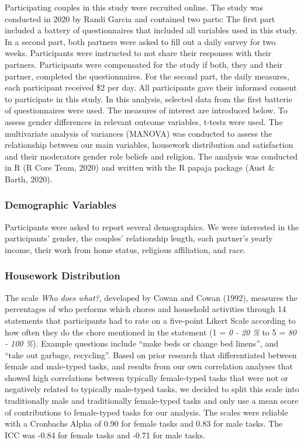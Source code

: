 \documentclass[
  man,floatsintext]{apa6}
\begin{document}
Participating couples in this study were recruited online. The study was conducted in 2020 by Randi Garcia and contained two parts: The first part included a battery of questionnaires that included all variables used in this study. In a second part, both partners were asked to fill out a daily survey for two weeks. Participants were instructed to not share their responses with their partners. Participants were compensated for the study if both, they and their partner, completed the questionnaires. For the second part, the daily measures, each participant received \$2 per day. All participants gave their informed consent to participate in this study.
In this analysis, selected data from the first batterie of questionnaires were used. The measures of interest are introduced below.
To assess gender differences in relevant outcome variables, t-tests were used. The multivariate analysis of variances (MANOVA) was conducted to assess the relationship between our main variables, housework distribution and satisfaction and their moderators gender role beliefs and religion.
The analysis was conducted in R (R Core Team, 2020) and written with the R papaja package (Aust \& Barth, 2020).

\hypertarget{demographic-variables}{%
\subsubsection{Demographic Variables}\label{demographic-variables}}

Participants were asked to report several demographics. We were interested in the participants' gender, the couples' relationship length, each partner's yearly income, their work from home status, religious affiliation, and race.

\hypertarget{housework-distribution}{%
\subsubsection{Housework Distribution}\label{housework-distribution}}

The scale \emph{Who does what?}, developed by Cowan and Cowan (1992), measures the percentages of who performs which chores and household activities through 14 statements that participants had to rate on a five-point Likert Scale according to how often they do the chore mentioned in the statement (1 = \emph{0 - 20 \%} to 5 = \emph{80 - 100 \%}). Example questions include ``make beds or change bed linens'', and ``take out garbage, recycling''. Based on prior research that differentiated between female and male-typed tasks, and results from our own correlation analyses that showed high correlations between typically female-typed tasks that were not or negatively related to typically male-typed tasks, we decided to split this scale into traditionally male and traditionally female-typed tasks and only use a mean score of contributions to female-typed tasks for our analysis. The scales were reliable with a Cronbachs Alpha of 0.90 for female tasks and 0.83 for male tasks. The ICC was -0.84 for female tasks and -0.71 for male tasks.
\end{document}
